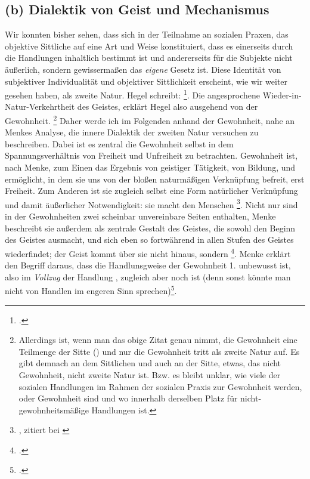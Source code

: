 \documentclass[12pt, a4paper, openany]{report}
\begin{document}
\subsection{(b) Dialektik von Geist und Mechanismus}
Wir konnten bisher sehen, dass sich in der Teilnahme an sozialen Praxen, das objektive Sittliche auf eine Art und Weise konstituiert, dass es einerseits durch die Handlungen inhaltlich bestimmt ist und andererseits für die Subjekte nicht äußerlich, sondern gewissermaßen das \emph{eigene} Gesetz ist. 
Diese Identität von subjektiver Individualität und objektiver Sittlichkeit erscheint, wie wir weiter gesehen haben, als zweite Natur.
Hegel schreibt: \footcite[][§ 151, S. 166]{hegel_grundlinien_2017}.
Die angesprochene Wieder-in-Natur-Verkehrtheit des Geistes, erklärt Hegel also ausgehend von der Gewohnheit.
\footnote{%
    Allerdings ist, wenn man das obige Zitat genau nimmt, die Gewohnheit eine Teilmenge der Sitte () und nur die Gewohnheit tritt als zweite Natur auf.
    Es gibt demnach an dem Sittlichen und auch an der Sitte, etwas, das nicht Gewohnheit, nicht zweite Natur ist. 
    Bzw. es bleibt unklar, wie viele der sozialen Handlungen im Rahmen der sozialen Praxis zur Gewohnheit werden, oder Gewohnheit sind und wo innerhalb derselben Platz für nicht-gewohnheitsmäßige Handlungen ist. 
}
Daher werde ich im Folgenden anhand der Gewohnheit, nahe an Menkes Analyse, die innere Dialektik der zweiten Natur versuchen zu beschreiben.
Dabei ist es zentral die Gewohnheit selbst in dem Spannungsverhältnis von Freiheit und Unfreiheit zu betrachten. 
Gewohnheit ist, nach Menke, zum Einen das Ergebnis von geistiger Tätigkeit, von Bildung, und ermöglicht, in dem sie uns von der bloßen naturmäßigen Verknüpfung befreit, erst Freiheit.
Zum Anderen ist sie zugleich selbst eine Form natürlicher Verknüpfung und damit äußerlicher Notwendigkeit: sie macht den Menschen \footnote{, zitiert bei \cite[][127]{menke_autonomie_2018}}.
Nicht nur sind in der Gewohnheiten zwei scheinbar unvereinbare Seiten enthalten, Menke beschreibt sie außerdem als zentrale Gestalt des Geistes, die sowohl den Beginn des Geistes ausmacht, und sich eben so fortwährend in allen Stufen des Geistes wiederfindet; 
der Geist kommt über sie nicht hinaus, sondern \footcite[][129]{menke_autonomie_2018}.
Menke erklärt den Begriff  daraus, dass die Handlunsgweise der Gewohnheit 1. unbewusst ist, also im \emph{Vollzug} der Handlung , zugleich aber noch  ist (denn sonst könnte man nicht von Handlen im engeren Sinn sprechen)\footcite[][128]{menke_autonomie_2018}.\\
\end{document}
